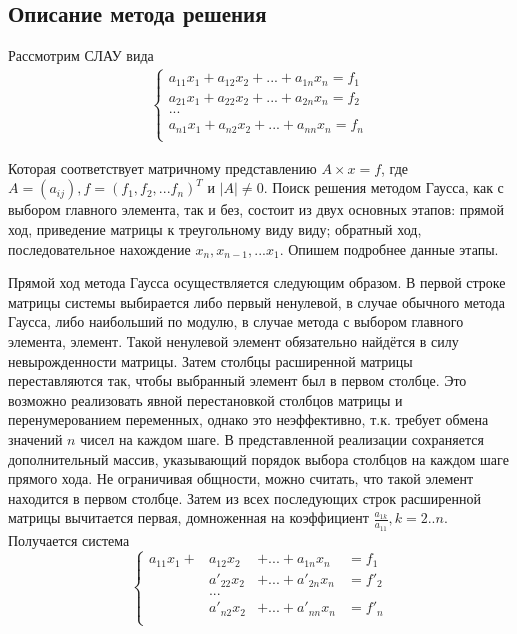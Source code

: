 \documentclass[a4paper,12pt,titlepage,finall]{article}
\begin{document}
\subsection{Описание метода решения}
Рассмотрим СЛАУ вида
\begin{align*}
\begin{cases}
a_{11} x_1 + a_{12} x_2 + ... + a_{1n} x_n = f_1\\
a_{21} x_1 + a_{22} x_2 + ... + a_{2n} x_n = f_2\\
...\\
a_{n1} x_1 + a_{n2} x_2 + ... + a_{nn} x_n = f_n\\
\end{cases}
\end{align*}
\par
Которая соответствует матричному представлению $A \times x = f$, где $A = (a_{ij}), f = (f_1, f_2, ... f_n)^T$ и $|A| \neq 0$. Поиск решения методом Гаусса, как с выбором главного элемента, так и без, состоит из двух основных этапов: прямой ход, приведение матрицы к треугольному виду виду; обратный ход, последовательное нахождение $x_n, x_{n - 1}, ... x_1$. Опишем подробнее данные этапы.
\par
Прямой ход метода Гаусса осуществляется следующим образом. В первой строке матрицы системы выбирается либо первый ненулевой, в случае обычного метода Гаусса, либо наибольший по модулю, в случае метода с выбором главного элемента, элемент. Такой ненулевой элемент обязательно найдётся в силу невырожденности матрицы. Затем столбцы расширенной матрицы переставляются так, чтобы выбранный элемент был в первом столбце. Это возможно реализовать явной перестановкой столбцов матрицы и перенумерованием переменных, однако это неэффективно, т.к. требует обмена значений $n$ чисел на каждом шаге. В представленной реализации сохраняется дополнительный массив, указывающий порядок выбора столбцов на каждом шаге прямого хода. Не ограничивая общности, можно считать, что такой элемент находится в первом столбце. Затем из всех последующих строк расширенной матрицы вычитается первая, домноженная на коэффициент $\frac{a_{1k}}{a_{11}}, k = 2 .. n$. Получается система
\begin{equation*}
\left\{
\begin{alignedat}{3}
a_{11} x_1 + &a_{12} x_2 &+ ... + a_{1n} x_n & = f_1\\
           &a'_{22} x_2 &+ ... + a'_{2n} x_n & = f'_2\\
&...&&\\
           &a'_{n2} x_2 &+ ... + a'_{nn} x_n & = f'_n\\
\end{alignedat}
\right.
\end{equation*}
\end{document}
